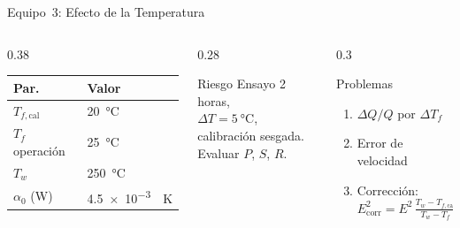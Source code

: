 \documentclass[aspectratio=169,12pt]{beamer}
\begin{document}
\begin{frame}{Equipo~3: Efecto de la Temperatura}
	\begin{columns}
		\begin{column}{0.38\textwidth}
			\centering\scriptsize
			\begin{tabular}{ll}
				\toprule
				\textbf{Par.}        & \textbf{Valor}           \\
				\midrule
				$T_{f,\mathrm{cal}}$ & \SI{20}{\degreeCelsius}  \\
				$T_f$ operación      & \SI{25}{\degreeCelsius}  \\
				$T_w$                & \SI{250}{\degreeCelsius} \\
				$\alpha_0$ (W)
				                     & \SI{4.5e-3}{\per\kelvin} \\
				\bottomrule
			\end{tabular}
		\end{column}
		\begin{column}{0.28\textwidth}
			\begin{alertblock}{\scriptsize Riesgo}
				\scriptsize
				Ensayo 2 horas,\\
				$\Delta T = \SI{5}{\degreeCelsius}$,\\
				calibración sesgada.\\
				Evaluar $P$, $S$, $R$.
			\end{alertblock}
		\end{column}
		\begin{column}{0.3\textwidth}
			\begin{exampleblock}{\scriptsize Problemas}
				\scriptsize
				\begin{enumerate}
					\item[C.1] $\Delta Q / Q$ por $\Delta T_f$
					\item[C.2] Error de velocidad
					\item[C.3] Corrección:\\
					      $E_\mathrm{corr}^2 = E^2\,
						      \frac{T_w-T_{f,\mathrm{cal}}}{T_w-T_f}$
				\end{enumerate}
			\end{exampleblock}
		\end{column}
	\end{columns}
\end{frame}
\end{document}
